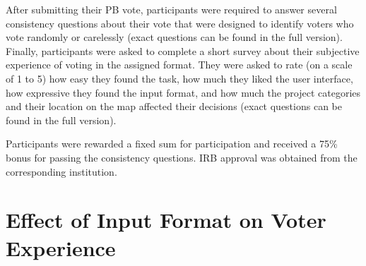 \documentclass[letterpaper]{article} %
\newcommand{\kibitz}[2]{\ifnum\Comments=1{\color{#1}{#2}}\fi}
\newcommand{\rf}[1]{\kibitz{blue}{[Roy says:#1]}}
\newcommand{\kg}[1]{\kibitz{red}{[Kobi says:#1]}}
\newcommand{\gb}[1]{\kibitz{brown}{[GB:#1]}}
\begin{document}


 
 After   submitting their PB vote, participants were required to answer several consistency questions about their vote that were  designed to identify voters who vote randomly or carelessly (exact questions can be found in the full version).  Finally, participants were asked to complete a short survey about their subjective experience of voting in the assigned format. They were asked to rate (on a scale of 1 to 5) how easy they found the task, how much they liked the user interface, %
  how   expressive  they found the input format, 
 and how much the project categories and their location on the map    affected their decisions (exact questions can be found in the full version). 
 
 Participants were rewarded a  fixed sum    for participation and  received a 75\% bonus for passing the  consistency questions.
 IRB approval was obtained from the corresponding institution.

 

\section{Effect of Input Format on Voter Experience}
\end{document}
